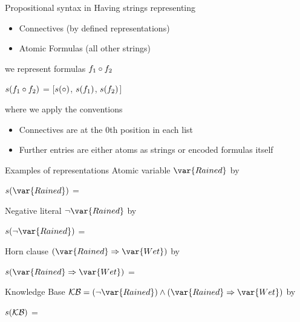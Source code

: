\documentclass{beamer}
\begin{document}
    \begin{frame}{Propositional syntax in \tnreason{}}
        Having strings representing
        \begin{itemize}
            \item Connectives (by defined representations)
            \item Atomic Formulas (all other strings)
        \end{itemize}
        we represent formulas $f_{1}\circ f_{2}$
        \begin{centeredscript}
            $s(f_{1}\circ f_{2})$ = [$s(\circ)$, $s(f_{1})$, $s(f_{2})$]
        \end{centeredscript}
        where we apply the conventions
        \begin{itemize}
            \item Connectives are at the 0th position in each list
            \item Further entries are either atoms as strings or encoded formulas itself
        \end{itemize}
    \end{frame}

    \begin{frame}{Examples of representations}
        Atomic variable $\var{Rained}$ by
        \begin{centeredscript}
            $\scriptrepof{\var{Rained}}$ = 
        \end{centeredscript}
        Negative literal $\lnot\var{Rained}$ by
        \begin{centeredscript}
            $\scriptrepof{\lnot\var{Rained}}$ = 
        \end{centeredscript}
        Horn clause $\left(\var{Rained}\Rightarrow\var{Wet}\right)$ by
        \begin{centeredscript}
            $\scriptrepof{\var{Rained}\Rightarrow\var{Wet}}$ = 
        \end{centeredscript}
        Knowledge Base
        $\kb=(\lnot\var{Rained})\land(\var{Rained}\Rightarrow\var{Wet})$ by
        \begin{centeredscript}
            $s(\mathcal{KB})$ = 
        \end{centeredscript}
    \end{frame}
\end{document}
